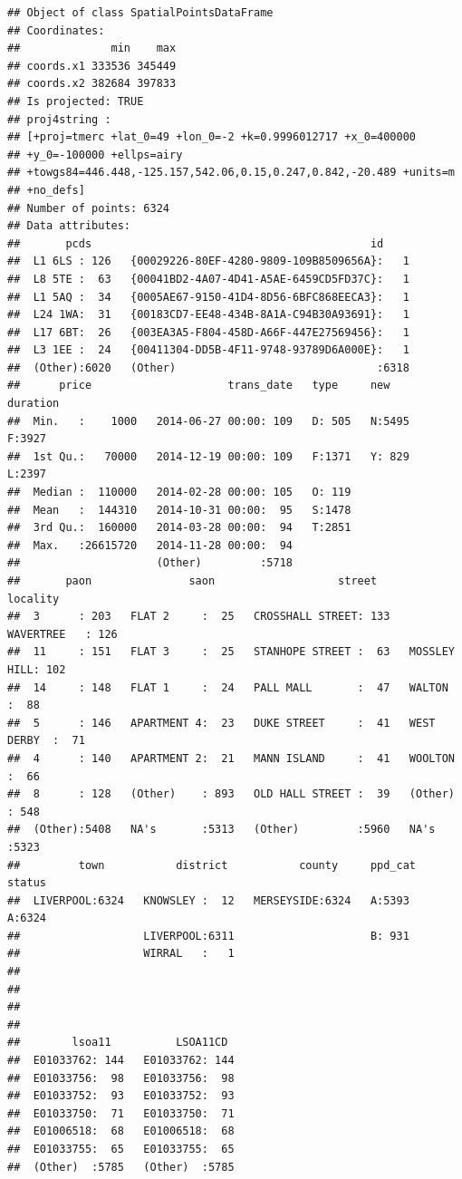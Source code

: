 \documentclass[]{book}
\begin{document}
\begin{verbatim}
## Object of class SpatialPointsDataFrame
## Coordinates:
##              min    max
## coords.x1 333536 345449
## coords.x2 382684 397833
## Is projected: TRUE 
## proj4string :
## [+proj=tmerc +lat_0=49 +lon_0=-2 +k=0.9996012717 +x_0=400000
## +y_0=-100000 +ellps=airy
## +towgs84=446.448,-125.157,542.06,0.15,0.247,0.842,-20.489 +units=m
## +no_defs]
## Number of points: 6324
## Data attributes:
##       pcds                                           id      
##  L1 6LS : 126   {00029226-80EF-4280-9809-109B8509656A}:   1  
##  L8 5TE :  63   {00041BD2-4A07-4D41-A5AE-6459CD5FD37C}:   1  
##  L1 5AQ :  34   {0005AE67-9150-41D4-8D56-6BFC868EECA3}:   1  
##  L24 1WA:  31   {00183CD7-EE48-434B-8A1A-C94B30A93691}:   1  
##  L17 6BT:  26   {003EA3A5-F804-458D-A66F-447E27569456}:   1  
##  L3 1EE :  24   {00411304-DD5B-4F11-9748-93789D6A000E}:   1  
##  (Other):6020   (Other)                               :6318  
##      price                     trans_date   type     new      duration
##  Min.   :    1000   2014-06-27 00:00: 109   D: 505   N:5495   F:3927  
##  1st Qu.:   70000   2014-12-19 00:00: 109   F:1371   Y: 829   L:2397  
##  Median :  110000   2014-02-28 00:00: 105   O: 119                    
##  Mean   :  144310   2014-10-31 00:00:  95   S:1478                    
##  3rd Qu.:  160000   2014-03-28 00:00:  94   T:2851                    
##  Max.   :26615720   2014-11-28 00:00:  94                             
##                     (Other)         :5718                             
##       paon               saon                   street             locality   
##  3      : 203   FLAT 2     :  25   CROSSHALL STREET: 133   WAVERTREE   : 126  
##  11     : 151   FLAT 3     :  25   STANHOPE STREET :  63   MOSSLEY HILL: 102  
##  14     : 148   FLAT 1     :  24   PALL MALL       :  47   WALTON      :  88  
##  5      : 146   APARTMENT 4:  23   DUKE STREET     :  41   WEST DERBY  :  71  
##  4      : 140   APARTMENT 2:  21   MANN ISLAND     :  41   WOOLTON     :  66  
##  8      : 128   (Other)    : 893   OLD HALL STREET :  39   (Other)     : 548  
##  (Other):5408   NA's       :5313   (Other)         :5960   NA's        :5323  
##         town           district           county     ppd_cat  status  
##  LIVERPOOL:6324   KNOWSLEY :  12   MERSEYSIDE:6324   A:5393   A:6324  
##                   LIVERPOOL:6311                     B: 931           
##                   WIRRAL   :   1                                      
##                                                                       
##                                                                       
##                                                                       
##                                                                       
##        lsoa11          LSOA11CD   
##  E01033762: 144   E01033762: 144  
##  E01033756:  98   E01033756:  98  
##  E01033752:  93   E01033752:  93  
##  E01033750:  71   E01033750:  71  
##  E01006518:  68   E01006518:  68  
##  E01033755:  65   E01033755:  65  
##  (Other)  :5785   (Other)  :5785
\end{verbatim}
\end{document}

